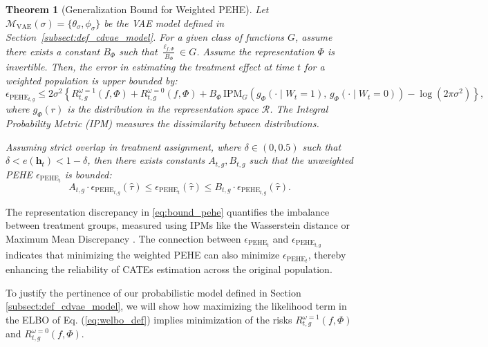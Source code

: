 \documentclass[10pt]{article} %
\newtheorem{theorem}{Theorem}
\begin{document}
\begin{theorem}[Generalization Bound for Weighted PEHE]
\label{thm:pehe_wbound}
Let \( \mathcal{M}_{\text{VAE}}(\sigma) = \{\theta_{\sigma}, \phi_{\sigma}\} \) be the VAE model defined in Section~\ref{subsect:def_cdvae_model}. For a given class of functions \( G \), assume there exists a constant \( B_{\Phi} \) such that \( \frac{\ell_{f,\Phi}}{B_{\Phi}} \in G \). Assume the representation \( \Phi \) is invertible. Then, the error in estimating the treatment effect at time \( t \) for a weighted population is upper bounded by:
\begin{equation}
\epsilon_{\mathrm{PEHE}_{t, g}} \leq 2\sigma^2 \left\{ R^{\omega = 1}_{t, g}\left(f, \Phi \right) + R^{\omega = 0}_{t, g}\left(f, \Phi \right) + B_{\Phi} \, \mathrm{IPM}_{G} \left( g_{\Phi}(\cdot \mid W_t = 1), \, g_{\Phi}(\cdot \mid W_t = 0) \right) - \log(2\pi\sigma^2) \right\},
\label{eq:bound_pehe}
\end{equation}
where \( g_{\Phi}(r) \) is the distribution in the representation space \( \mathcal{R} \). The Integral Probability Metric (IPM) \citep{muller1997IPM, sriperumbudur2009integral} measures the dissimilarity between distributions.

Assuming strict overlap in treatment assignment, where \( \delta \in (0, 0.5) \) such that \( \delta < e(\mathbf{h}_t) < 1 - \delta \), then there exists constants \(A_{t,g}, B_{t,g}\)  such that the unweighted PEHE \( \epsilon_{\mathrm{PEHE}_{t}} \) is bounded:
\[
A_{t,g} \cdot \epsilon_{\mathrm{PEHE}_{t,g}}(\hat{\tau}) \leq \epsilon_{\mathrm{PEHE}_{t}}(\hat{\tau}) \leq B_{t,g} \cdot \epsilon_{\mathrm{PEHE}_{t,g}}(\hat{\tau}).
\label{eq:bound_pehe_strict_delta}
\]
\end{theorem}

The representation discrepancy in \ref{eq:bound_pehe} quantifies the imbalance between treatment groups, measured using IPMs like the Wasserstein distance or Maximum Mean Discrepancy \citep{gretton2012kernel}. The connection between \( \epsilon_{\mathrm{PEHE}_{t}} \) and \( \epsilon_{\mathrm{PEHE}_{t,g}} \) indicates that minimizing the weighted PEHE can also minimize \( \epsilon_{\mathrm{PEHE}_{t}} \), thereby enhancing the reliability of CATEs estimation across the original population.   

To justify the pertinence of our probabilistic model defined in Section \ref{subsect:def_cdvae_model}, we will show how maximizing the likelihood term in the ELBO of Eq. (\ref{eq:welbo_def}) implies minimization of the risks \( R^{\omega = 1}_{t, g}\left(f, \Phi \right) \) and \( R^{\omega = 0}_{t, g}\left(f, \Phi \right) \).
\end{document}
